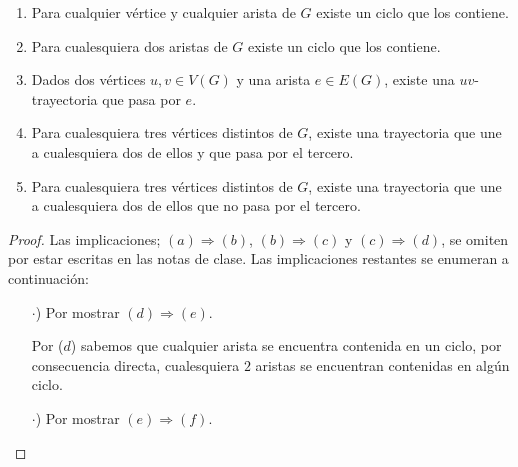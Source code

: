 \documentclass{article}
\begin{document}
\begin{enumerate}
\begin{enumerate}
  \item Para cualquier v\'ertice y cualquier arista de $G$ existe un ciclo
    que los contiene.

  \item Para cualesquiera dos aristas de $G$ existe un ciclo que los
    contiene.

  \item Dados dos v\'ertices $u,v \in V(G)$ y una arista $e \in E(G)$,
    existe una $uv$-trayectoria que pasa por $e$.

  \item Para cualesquiera tres v\'ertices distintos de $G$, existe una
    trayectoria que une a cualesquiera dos de ellos y que pasa por el
    tercero.

  \item Para cualesquiera tres v\'ertices distintos de $G$, existe una
    trayectoria que une a cualesquiera dos de ellos que no pasa por el
    tercero.
  \end{enumerate}
  
  \renewcommand\qedsymbol{QED}
  \begin{proof}  
    Las implicaciones; $(a) \Rightarrow (b)$, $(b) \Rightarrow (c)$
    y $(c) \Rightarrow (d)$, se omiten por estar escritas en las
    notas de clase. Las implicaciones restantes se enumeran a
    continuación:
    \begin{itemize}
    \item[$\cdot$)] Por mostrar $(d) \Rightarrow (e)$.
      
      Por ($d$) sabemos que cualquier arista se encuentra
      contenida en un ciclo, por consecuencia directa,
      cualesquiera $2$ aristas se encuentran contenidas en
      algún ciclo.
    \item[$\cdot$)] Por mostrar $(e) \Rightarrow (f)$.
      

\end{itemize}
\end{proof}
\end{enumerate}
\end{document}
